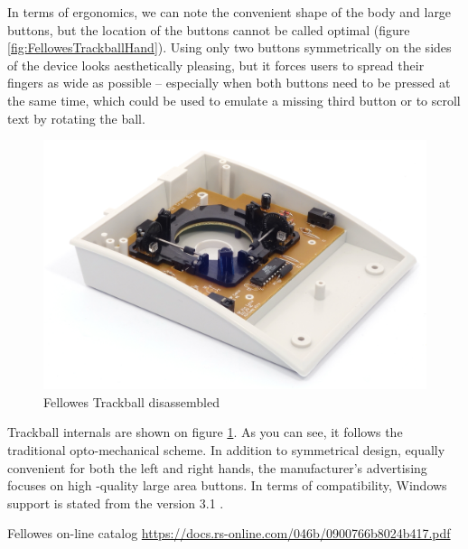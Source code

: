 \documentclass[11pt, a4paper]{article}
\begin{document}
In terms of ergonomics, we can note the convenient shape of the body and large buttons, but the location of the buttons cannot be called optimal (figure \ref{fig:FellowesTrackballHand}). Using only two buttons symmetrically on the sides of the device looks aesthetically pleasing, but it forces users to spread their fingers as wide as possible -- especially when both buttons need to be pressed at the same time, which could be used to emulate a missing third button or to scroll text by rotating the ball.

\begin{figure}[h]
    \centering
    \includegraphics[scale=0.7]{1997_fellowes_trackball/inside_60.jpg}
    \caption{Fellowes Trackball disassembled}
    \label{fig:FellowesTrackballInside}
\end{figure}

Trackball internals are shown on figure \ref{fig:FellowesTrackballInside}. As you can see, it follows the traditional opto-mechanical scheme. In addition to symmetrical design, equally convenient for both the left and right hands, the manufacturer’s advertising focuses on high -quality large area buttons. In terms of compatibility, Windows support is stated from the version 3.1 \cite{advertising}.

\begin{thebibliography}{9}
 Fellowes on-line catalog \url{https://docs.rs-online.com/046b/0900766b8024b417.pdf}
\end{thebibliography}
\end{document}
